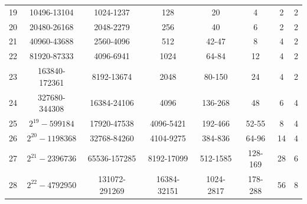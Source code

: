 \begin{table}[H]
\begin{tabular}{c c c c c c c c}
19 & 10496-13104  & 1024-1237    & 128  & 20   & 4    & 2    & 2 \\
20 & 20480-26168  & 2048-2279    & 256  & 40   & 6    & 2    & 2 \\
21 & 40960-43688  & 2560-4096    & 512  & 42-47& 8    & 4    & 2 \\
22 & 81920-87333  & 4096-6941    & 1024 & 64-84& 12   & 4    & 2 \\
23 & 163840-172361& 8192-13674   & 2048 & 80-150&24   & 4    & 2 \\
24 & 327680-344308& 16384-24106  & 4096 & 136-268&48  & 6    & 4 \\
25 & $2^{19}-599184$ & 17920-47538 & 4096-5421 & 192-466 & 52-55 & 8 & 4 \\
26 & $2^{20}-1198368$ & 32768-84260 & 4104-9275 & 384-836 & 64-96 & 14 & 4 \\
27 & $2^{21}-2396736$ & 65536-157285 & 8192-17099 & 512-1585 & 128-169 & 28 & 6 \\
28 & $2^{22}-4792950$ & 131072-291269 & 16384-32151 & 1024-2817 & 178-288 & 56 & 8 \\
\bottomrule
\end{tabular}
\end{table}
